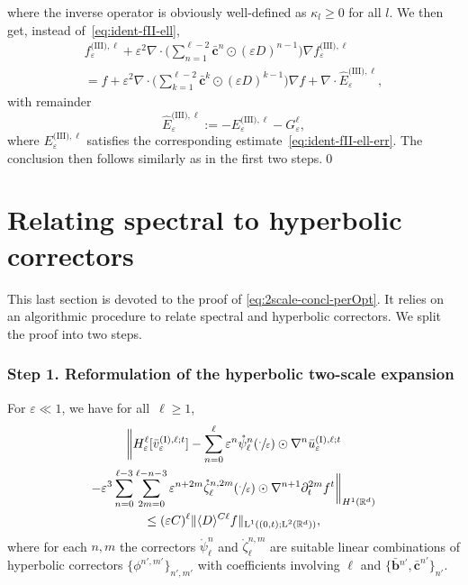 \documentclass[JEP,XML,SOM,Unicode,published]{cedram}
\theoremstyle{plain}
\theoremstyle{definition}
\numberwithin{equation}{section}
\newcommand{\e}{\varepsilon}
\newcommand{\R}{\mathbb R}
\newcommand{\bb}{{\boldsymbol b}}
\newcommand{\cc}{{\boldsymbol c}}
\newcommand{\Ld}{\operatorname{L}}
\newcommand{\step}[1]{\subsubsection*{Step \textup #1}}
\begin{document}
where the inverse operator is obviously well-defined as $\kappa_l\ge0$ for all $l$.
We then get, instead of~\eqref{eq:ident-fII-ell},\vspace*{-5pt}
\begin{multline*}
f_\e^{\text{(III)},\ell}+\e^2\nabla\cdot\Big(\sum_{n=1}^{\ell-2}\bar\cc^n\odot(\e D)^{n-1}\Big)\nabla f_\e^{\text{(III)},\ell}\\[-8pt]
=f+\e^2\nabla\cdot\Big(\sum_{k=1}^{\ell-2}\bar\cc^k\odot(\e D)^{k-1}\Big)\nabla f+\nabla\cdot\hat E_\e^{\text{(III)},\ell},
\end{multline*}
with remainder\vspace*{-3pt}
\[\hat E_\e^{\text{(III)},\ell}:=-E_\e^{\text{(III)},\ell}-G_\e^{\ell},\]
where $E_\e^{\text{(III)},\ell}$ satisfies the corresponding estimate~\eqref{eq:ident-fII-ell-err}.
The conclusion then follows similarly as in the first two steps.\qed

\section{Relating spectral to hyperbolic correctors}\label{sec:fromGeom2Spec}

This last section is devoted to the proof of \eqref{eq:2scale-concl-perOpt}.
It relies on an algorithmic procedure to relate spectral and hyperbolic correctors. We split the proof into two steps.

\step{1. Reformulation of the hyperbolic two-scale expansion} For $\e\ll1$, we have for all~$\ell\ge1$,\vspace*{-8pt}
\begin{multline}\label{eq:tadam}
\bigg\|H^\ell_\e[\bar v_\e^{\text{(I)},\ell;t}]
-\sum_{n=0}^\ell\e^{n}\mathring\psi_\ell^{n}(\sfrac{\cdot}{\e})\odot\nabla^{n}\bar{u}^{\text{(I)},\ell;t}_{\e}
\\
-\e^3\sum_{n=0}^{\ell-3}\sum_{2m=0}^{\ell-n-3}\e^{n+2m}\mathring\zeta_\ell^{n,2m}(\sfrac\cdot\e)\odot \nabla^{n+1}\partial_t^{2m}f^t\bigg\|_{H^1(\R^d)}\\
\le (\e C)^{\ell}\|\langle D\rangle^{C\ell}f\|_{\Ld^1((0,t);\Ld^2(\R^d))},
\end{multline}
where for each $n,m$ the correctors $\mathring\psi_\ell^{n}$ and $\mathring\zeta_\ell^{n,m}$ are suitable linear combinations of hyperbolic correctors $\{\phi^{n',m'}\}_{n',m'}$ with coefficients involving $\ell$ and $\{\bar\bb{}^{n'},\bar\cc^{n'}\}_{n'}$.
\end{document}
